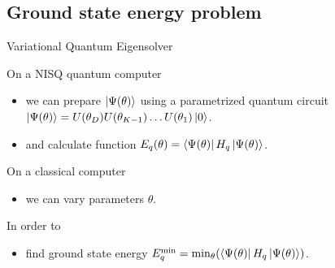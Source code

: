 \subsection{Ground state energy problem}
\begingroup
\begin{frame}{Variational Quantum Eigensolver}
    \begin{block}{On a NISQ quantum computer}
    \begin{itemize}
        \item we can prepare $\ket{\Psi(\theta)}$ using a parametrized quantum circuit
        $\ket{\Psi(\theta)} = U(\theta_D)U(\theta_{K-1})\ldots U(\theta_1)\ket{0}$.
        \item and calculate function $E_q(\theta) = \bra{\Psi(\theta)}H_q\ket{\Psi(\theta)}$.
    \end{itemize}
    \end{block}
    \begin{block}{On a classical computer}
        \begin{itemize}
            \item we can vary parameters $\theta$.
        \end{itemize}
    \end{block}
    \begin{block}{In order to}
        \begin{itemize}
        \item find ground state energy $E_q^\text{min} = \min_\theta(\bra{\Psi(\theta)}H_q\ket{\Psi(\theta)})$.
        \end{itemize}
    \end{block}   
\end{frame}
\endgroup
\begingroup
